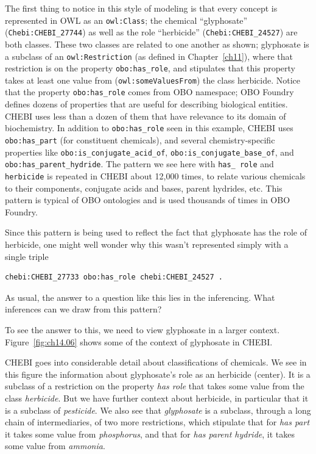 The first thing to notice in this style of modeling is that every
concept is represented in OWL as an \texttt{owl:Class}; the chemical
``glyphosate'' (\texttt{Chebi:CHEBI\_27744}) as well as the role ``herbicide''
(\texttt{Chebi:CHEBI\_24527}) are both classes. These two classes are related to
one another as shown; glyphosate is a subclass of an \texttt{owl:Restriction} (as
defined in Chapter~\ref{ch11}), where that restriction is on the property
\texttt{obo:has\_role}, and stipulates that this property takes at least one
value from (\texttt{owl:someValuesFrom}) the class herbicide. Notice that the
property \texttt{obo:has\_role} comes from OBO namespace; OBO Foundry defines
dozens of properties that are useful for describing biological
entities. CHEBI uses less than a dozen of them that have relevance to
its domain of biochemistry. In addition to \texttt{obo:has\_role} seen in this
example, CHEBI uses \texttt{obo:has\_part} (for constituent chemicals), and
several chemistry-specific properties like \texttt{obo:is\_conjugate\_acid\_of},
\texttt{obo:is\_conjugate\_base\_of}, and \texttt{obo:has\_parent\_hydride}. The pattern
we see here with \texttt{has\_ role} and \texttt{herbicide} is repeated in CHEBI
about 12,000 times, to relate various chemicals to their components,
conjugate acids and bases, parent hydrides, etc. This pattern is typical
of OBO ontologies and is used thousands of times in OBO Foundry.

Since this pattern is being used to reflect the fact that glyphosate has
the role of herbicide, one might well wonder why this wasn't represented
simply with a single triple

\begin{lstlisting}
chebi:CHEBI_27733 obo:has_role chebi:CHEBI_24527 .
\end{lstlisting}

As usual, the answer to a question like this lies in the inferencing.
What inferences can we draw from this pattern?

To see the answer to this, we need to view glyphosate in a larger
context. Figure~\ref{fig:ch14.06} shows some of the context of glyphosate in CHEBI.

CHEBI goes into considerable detail about classifications of chemicals.
We see in this figure the information about glyphosate's role as an
herbicide (center). It is a subclass of a restriction on the property
\textit{has role} that takes some value from the class \textit{herbicide}. But we have
further context about herbicide, in particular that it is a subclass of
\textit{pesticide}. We also see that \textit{glyphosate} is a subclass, through a long
chain of intermediaries, of two more restrictions, which stipulate that
for\textit{ has part} it takes some value from \textit{phosphorus}, and that for\textit{ has
parent hydride}, it takes some value from \textit{ammonia}.


